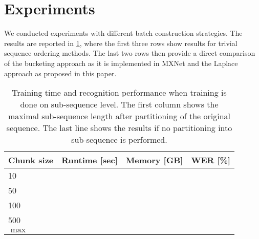 \documentclass{article}
\begin{document}
  \section{Experiments} \label{sec:experiments}
   We conducted experiments with different batch construction strategies. The results are reported in \ref{tab:chime:batch}, where the first three rows show results for trivial sequence ordering 
   methods. The last two rows then provide a direct comparison of the bucketing approach as 
   it is implemented in MXNet and the Laplace approach as proposed in this paper.

	\begin{table}[tbp]
		\centering
		\caption{Training time and recognition performance when training is done 
		on sub-sequence level. The first column shows the maximal sub-sequence length 
		after partitioning of the original sequence. The last line shows the results 
		if no partitioning into sub-sequence is performed. }
		\label{tab:chime:batch}
		\begin{tabular}{lrrr}
			\hline
			Chunk size              & Runtime [sec] & Memory [GB] & WER [\%] \\
			\hline
			10     					&				&			  &			 \\
			50  					&				&			  & 		 \\
			100 					& 				&			  &			 \\
			500						& 				&			  &			 \\
			$\max$					&				&			  &			 \\
			\hline
		\end{tabular}
	\end{table}
\end{document}
